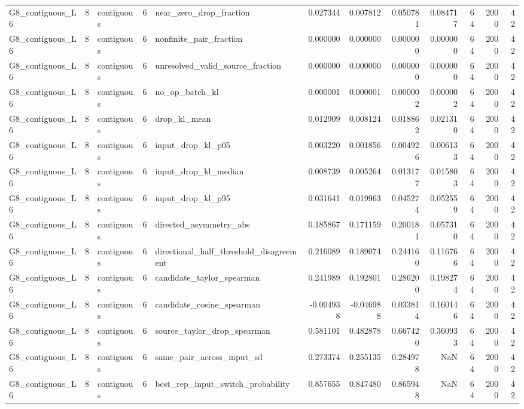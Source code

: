 \begin{tabular}{lrlrlrrrrrrr}
G8_contiguous_L6 & 8 & contiguous & 6 & near_zero_drop_fraction & 0.027344 & 0.007812 & 0.050781 & 0.084717 & 64 & 2000 & 42 \\
G8_contiguous_L6 & 8 & contiguous & 6 & nonfinite_pair_fraction & 0.000000 & 0.000000 & 0.000000 & 0.000000 & 64 & 2000 & 42 \\
G8_contiguous_L6 & 8 & contiguous & 6 & unresolved_valid_source_fraction & 0.000000 & 0.000000 & 0.000000 & 0.000000 & 64 & 2000 & 42 \\
G8_contiguous_L6 & 8 & contiguous & 6 & no_op_batch_kl & 0.000001 & 0.000001 & 0.000002 & 0.000002 & 64 & 2000 & 42 \\
G8_contiguous_L6 & 8 & contiguous & 6 & drop_kl_mean & 0.012909 & 0.008124 & 0.018862 & 0.021310 & 64 & 2000 & 42 \\
G8_contiguous_L6 & 8 & contiguous & 6 & input_drop_kl_p05 & 0.003220 & 0.001856 & 0.004926 & 0.006133 & 64 & 2000 & 42 \\
G8_contiguous_L6 & 8 & contiguous & 6 & input_drop_kl_median & 0.008739 & 0.005264 & 0.013177 & 0.015803 & 64 & 2000 & 42 \\
G8_contiguous_L6 & 8 & contiguous & 6 & input_drop_kl_p95 & 0.031641 & 0.019963 & 0.045274 & 0.052559 & 64 & 2000 & 42 \\
G8_contiguous_L6 & 8 & contiguous & 6 & directed_asymmetry_abs & 0.185867 & 0.171159 & 0.200181 & 0.057310 & 64 & 2000 & 42 \\
G8_contiguous_L6 & 8 & contiguous & 6 & directional_half_threshold_disagreement & 0.216089 & 0.189074 & 0.244160 & 0.116766 & 64 & 2000 & 42 \\
G8_contiguous_L6 & 8 & contiguous & 6 & candidate_taylor_spearman & 0.241989 & 0.192801 & 0.286200 & 0.198274 & 64 & 2000 & 42 \\
G8_contiguous_L6 & 8 & contiguous & 6 & candidate_cosine_spearman & -0.004938 & -0.046988 & 0.033814 & 0.160146 & 64 & 2000 & 42 \\
G8_contiguous_L6 & 8 & contiguous & 6 & source_taylor_drop_spearman & 0.581101 & 0.482878 & 0.667420 & 0.360933 & 64 & 2000 & 42 \\
G8_contiguous_L6 & 8 & contiguous & 6 & same_pair_across_input_sd & 0.273374 & 0.255135 & 0.284978 & NaN & 64 & 2000 & 42 \\
G8_contiguous_L6 & 8 & contiguous & 6 & best_rep_input_switch_probability & 0.857655 & 0.847480 & 0.865948 & NaN & 64 & 2000 & 42 \\
\bottomrule
\end{tabular}
